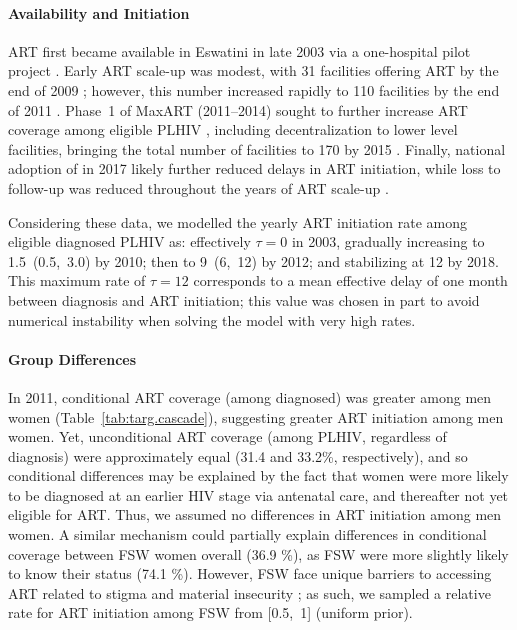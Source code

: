 \paragraph{Availability and Initiation}
ART first became available in Eswatini in late 2003
via a one-hospital pilot project \cite{NERCHA2012rep}.
Early ART scale-up was modest, with 31 facilities offering ART by the end of 2009 \cite{CDC2013art};
however, this number increased rapidly
to 110 facilities by the end of 2011 \cite{NERCHA2012rep}.
Phase~1 of MaxART (2011--2014) sought to
further increase ART coverage among eligible PLHIV \cite{MaxART1},
including decentralization to lower level facilities,
bringing the total number of facilities to 170 by 2015 \cite{EswMOH2015rep}.
Finally, national adoption of  in 2017
likely further reduced delays in ART initiation,
while loss to follow-up was reduced throughout the years of ART scale-up \cite{MaxART2}.
\par
Considering these data, we modelled the yearly ART initiation rate among eligible diagnosed PLHIV as:
effectively $\tau = 0$ in 2003, gradually increasing to 1.5~(0.5,~3.0) by 2010;
then to 9~(6,~12) by 2012; and stabilizing at 12 by 2018.
This maximum rate of $\tau = 12$ corresponds to
a mean effective delay of one month between diagnosis and ART initiation;
this value was chosen in part to avoid numerical instability
when solving the model with very high rates.
\paragraph{Group Differences}
In 2011, conditional ART coverage (among diagnosed) was greater among men \vs women
(Table~\ref{tab:targ.cascade}),
suggesting greater ART initiation among men \vs women.
Yet, unconditional ART coverage (among PLHIV, regardless of diagnosis)
were approximately equal (31.4 and 33.2\%, respectively),
and so conditional differences may be explained by the fact that
women were more likely to be diagnosed at an earlier HIV stage via antenatal care,
and thereafter not yet eligible for ART.
Thus, we assumed no differences in ART initiation among men \vs women.
A similar mechanism could partially explain
differences in conditional coverage between FSW \vs women overall (36.9 \%),
as FSW were more slightly likely to know their status (74.1 \%).
However, FSW face unique barriers to accessing ART
related to stigma and material insecurity \cite{Lancaster2016sr};
as such, we sampled a relative rate for ART initiation among FSW from [0.5,~1] (uniform prior).
